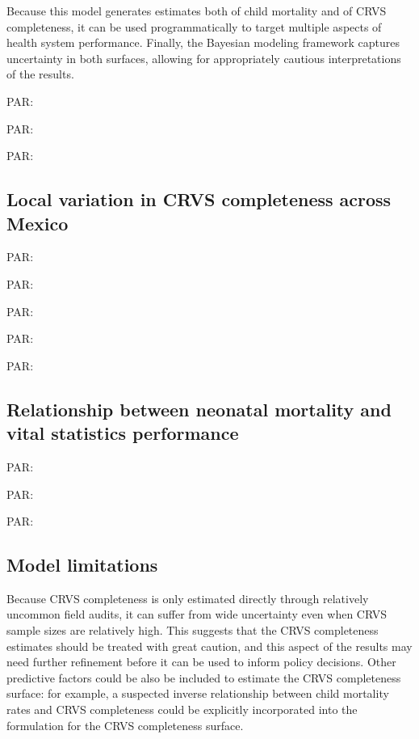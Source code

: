 \documentclass[
]{article}
\begin{document}
Because this model generates estimates both of child mortality and of CRVS completeness, it can be used programmatically to target multiple aspects of health system performance. Finally, the Bayesian modeling framework captures uncertainty in both surfaces, allowing for appropriately cautious interpretations of the results.

PAR:

PAR:

PAR:

\hypertarget{local-variation-in-crvs-completeness-across-mexico}{%
\subsection{Local variation in CRVS completeness across Mexico}\label{local-variation-in-crvs-completeness-across-mexico}}

PAR:

PAR:

PAR:

PAR:

PAR:

\hypertarget{relationship-between-neonatal-mortality-and-vital-statistics-performance}{%
\subsection{Relationship between neonatal mortality and vital statistics performance}\label{relationship-between-neonatal-mortality-and-vital-statistics-performance}}

PAR:

PAR:

PAR:

\hypertarget{model-limitations}{%
\subsection{Model limitations}\label{model-limitations}}

Because CRVS completeness is only estimated directly through relatively uncommon field audits, it can suffer from wide uncertainty even when CRVS sample sizes are relatively high. This suggests that the CRVS completeness estimates should be treated with great caution, and this aspect of the results may need further refinement before it can be used to inform policy decisions. Other predictive factors could be also be included to estimate the CRVS completeness surface: for example, a suspected inverse relationship between child mortality rates and CRVS completeness could be explicitly incorporated into the formulation for the CRVS completeness surface.
\end{document}

